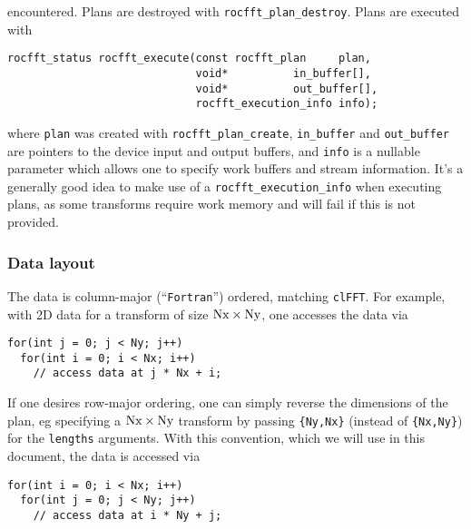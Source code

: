 \documentclass[10pt]{article}
\renewcommand{\(}{\left(}
\renewcommand{\)}{\right)}
\begin{document}
encountered.  Plans are destroyed with
\lstinline{rocfft_plan_destroy}.  Plans are executed with
\begin{lstlisting}
rocfft_status rocfft_execute(const rocfft_plan     plan,
                             void*          in_buffer[],
                             void*          out_buffer[],
                             rocfft_execution_info info);
\end{lstlisting}
where \lstinline{plan} was created with
\lstinline{rocfft_plan_create}, \lstinline{in_buffer} and
\lstinline{out_buffer} are pointers to the device input and output
buffers, and \lstinline{info} is a nullable parameter which allows one
to specify work buffers and stream information.  It's a generally good
idea to make use of a \lstinline{rocfft_execution_info} when executing
plans, as some transforms require work memory and will fail if this is
not provided.

\subsubsection{Data layout}
\label{ssdatalayout}
The data is column-major (``\texttt{Fortran}'') ordered, matching
\texttt{clFFT}.  For example, with 2D data for a transform of size
$\text{\lstinline{Nx}}\times\text{\lstinline{Ny}}$, one accesses the
data via
\begin{lstlisting}
for(int j = 0; j < Ny; j++)
  for(int i = 0; i < Nx; i++)
    // access data at j * Nx + i;
\end{lstlisting}
If one desires row-major ordering, one can simply reverse the
dimensions of the plan, eg specifying a
$\text{\lstinline{Nx}}\times\text{\lstinline{Ny}}$ transform by
passing \lstinline|{Ny,Nx}| (instead of \lstinline|{Nx,Ny}|) for the
\lstinline|lengths| arguments.  With this convention, which we will
use in this document, the data is accessed via 
\begin{lstlisting}
for(int i = 0; i < Nx; i++)
  for(int j = 0; j < Ny; j++)
    // access data at i * Ny + j;
\end{lstlisting}
\end{document}
